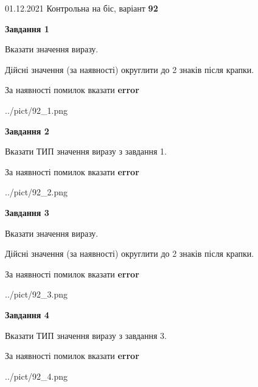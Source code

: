 \documentclass[11pt, ukrainian]{article}
\begin{document}
{01.12.2021 Контрольна на біс, варіант  \No \textbf { 92 }\par}
{
\begin {large}
{\begin {center}\textbf{Завдання 1}\end {center}}\par
Вказати значення виразу. \par
Дійсні значення (за наявності) округлити до 2 знаків після крапки. \par
За наявності помилок вказати \textbf{error}

\begin{center}
	{../pict/92_1.png}
\end{center}
\newpage

{\begin {center}\textbf{Завдання 2}\end {center}}\par
Вказати ТИП значення виразу з завдання 1. \par
За наявності помилок вказати \textbf{error}

\begin{center}
	{../pict/92_2.png}
\end{center}
\newpage

{\begin {center}\textbf{Завдання 3}\end {center}}\par
Вказати значення виразу. \par
Дійсні значення (за наявності) округлити до 2 знаків після крапки. \par
За наявності помилок вказати \textbf{error}

\begin{center}
	{../pict/92_3.png}
\end{center}
\newpage

{\begin {center}\textbf{Завдання 4}\end {center}}\par
Вказати ТИП значення виразу з завдання 3. \par
За наявності помилок вказати \textbf{error}

\begin{center}
	{../pict/92_4.png}
\end{center}
\newpage


\end{large}}
\end{document}

